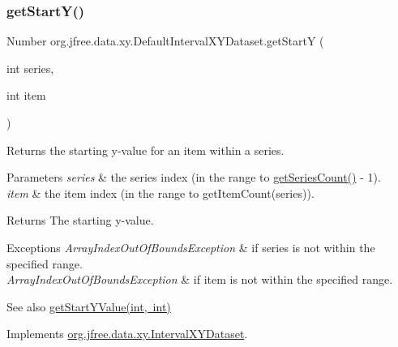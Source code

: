 \subsubsection{\texorpdfstring{get\+Start\+Y()}{getStartY()}}
{\footnotesize\ttfamily Number org.\+jfree.\+data.\+xy.\+Default\+Interval\+X\+Y\+Dataset.\+get\+StartY (\begin{DoxyParamCaption}\item[{int}]{series,  }\item[{int}]{item }\end{DoxyParamCaption})}

Returns the starting y-\/value for an item within a series.


\begin{DoxyParams}{Parameters}
{\em series} & the series index (in the range {} to {\ttfamily \mbox{\hyperlink{classorg_1_1jfree_1_1data_1_1xy_1_1_default_interval_x_y_dataset_a11470bfa9b540c971123d4282c0f5a8a}{get\+Series\+Count()}} -\/ 1}). \\
\hline
{\em item} & the item index (in the range {} to {\ttfamily get\+Item\+Count(series)}).\\
\hline
\end{DoxyParams}
\begin{DoxyReturn}{Returns}
The starting y-\/value.
\end{DoxyReturn}

\begin{DoxyExceptions}{Exceptions}
{\em Array\+Index\+Out\+Of\+Bounds\+Exception} & if {\ttfamily series} is not within the specified range. \\
\hline
{\em Array\+Index\+Out\+Of\+Bounds\+Exception} & if {\ttfamily item} is not within the specified range.\\
\hline
\end{DoxyExceptions}
\begin{DoxySeeAlso}{See also}
\mbox{\hyperlink{classorg_1_1jfree_1_1data_1_1xy_1_1_default_interval_x_y_dataset_ac785b0168a489e325d773943bdbfb0e7}{get\+Start\+Y\+Value(int, int)}} 
\end{DoxySeeAlso}


Implements \mbox{\hyperlink{interfaceorg_1_1jfree_1_1data_1_1xy_1_1_interval_x_y_dataset_afdd414735adb233734bc35b76a005ed9}{org.\+jfree.\+data.\+xy.\+Interval\+X\+Y\+Dataset}}.

\mbox{\label{classorg_1_1jfree_1_1data_1_1xy_1_1_default_interval_x_y_dataset_ac785b0168a489e325d773943bdbfb0e7}} 
